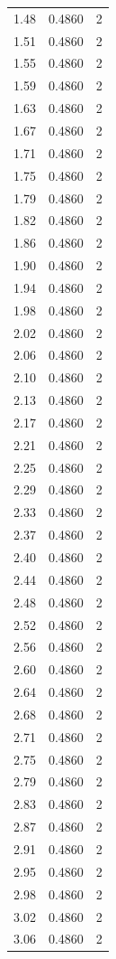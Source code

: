 \begin{longtable}{lrr}
  1.48 & 0.4860 & 2 \\
  1.51 & 0.4860 & 2 \\
  1.55 & 0.4860 & 2 \\
  1.59 & 0.4860 & 2 \\
  1.63 & 0.4860 & 2 \\
  1.67 & 0.4860 & 2 \\
  1.71 & 0.4860 & 2 \\
  1.75 & 0.4860 & 2 \\
  1.79 & 0.4860 & 2 \\
  1.82 & 0.4860 & 2 \\
  1.86 & 0.4860 & 2 \\
  1.90 & 0.4860 & 2 \\
  1.94 & 0.4860 & 2 \\
  1.98 & 0.4860 & 2 \\
  2.02 & 0.4860 & 2 \\
  2.06 & 0.4860 & 2 \\
  2.10 & 0.4860 & 2 \\
  2.13 & 0.4860 & 2 \\
  2.17 & 0.4860 & 2 \\
  2.21 & 0.4860 & 2 \\
  2.25 & 0.4860 & 2 \\
  2.29 & 0.4860 & 2 \\
  2.33 & 0.4860 & 2 \\
  2.37 & 0.4860 & 2 \\
  2.40 & 0.4860 & 2 \\
  2.44 & 0.4860 & 2 \\
  2.48 & 0.4860 & 2 \\
  2.52 & 0.4860 & 2 \\
  2.56 & 0.4860 & 2 \\
  2.60 & 0.4860 & 2 \\
  2.64 & 0.4860 & 2 \\
  2.68 & 0.4860 & 2 \\
  2.71 & 0.4860 & 2 \\
  2.75 & 0.4860 & 2 \\
  2.79 & 0.4860 & 2 \\
  2.83 & 0.4860 & 2 \\
  2.87 & 0.4860 & 2 \\
  2.91 & 0.4860 & 2 \\
  2.95 & 0.4860 & 2 \\
  2.98 & 0.4860 & 2 \\
  3.02 & 0.4860 & 2 \\
  3.06 & 0.4860 & 2 \\

\end{longtable}
